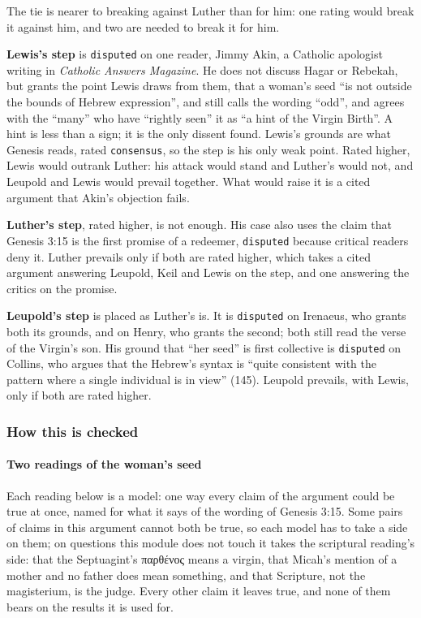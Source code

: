 \documentclass[11pt]{article}
\begin{document}
The tie is nearer to breaking against Luther than for him: one rating would break it against him, and two are needed to break it for him.

\textbf{Lewis’s step} is \texttt{disputed} on one reader, Jimmy Akin, a Catholic apologist writing in \emph{Catholic Answers Magazine}. He does not discuss Hagar or Rebekah, but grants the point Lewis draws from them, that a woman’s seed “is not outside the bounds of Hebrew expression”, and still calls the wording “odd”, and agrees with the “many” who have “rightly seen” it as “a hint of the Virgin Birth”. A hint is less than a sign; it is the only dissent found. Lewis’s grounds are what Genesis reads, rated \texttt{consensus}, so the step is his only weak point. Rated higher, Lewis would outrank Luther: his attack would stand and Luther’s would not, and Leupold and Lewis would prevail together. What would raise it is a cited argument that Akin’s objection fails.

\textbf{Luther’s step}, rated higher, is not enough. His case also uses the claim that Genesis 3:15 is the first promise of a redeemer, \texttt{disputed} because critical readers deny it. Luther prevails only if both are rated higher, which takes a cited argument answering Leupold, Keil and Lewis on the step, and one answering the critics on the promise.

\textbf{Leupold’s step} is placed as Luther’s is. It is \texttt{disputed} on Irenaeus, who grants both its grounds, and on Henry, who grants the second; both still read the verse of the Virgin’s son. His ground that “her seed” is first collective is \texttt{disputed} on Collins, who argues that the Hebrew’s syntax is “quite consistent with the pattern where a single individual is in view” (145). Leupold prevails, with Lewis, only if both are rated higher.

\subsubsection*{How this is checked}
\paragraph*{Two readings of the woman’s seed}
\leavevmode\par\nobreak
Each reading below is a model: one way every claim of the argument could be true at once, named for what it says of the wording of Genesis 3:15. Some pairs of claims in this argument cannot both be true, so each model has to take a side on them; on questions this module does not touch it takes the scriptural reading’s side: that the Septuagint’s παρθένος means a virgin, that Micah’s mention of a mother and no father does mean something, and that Scripture, not the magisterium, is the judge. Every other claim it leaves true, and none of them bears on the results it is used for.
\end{document}
